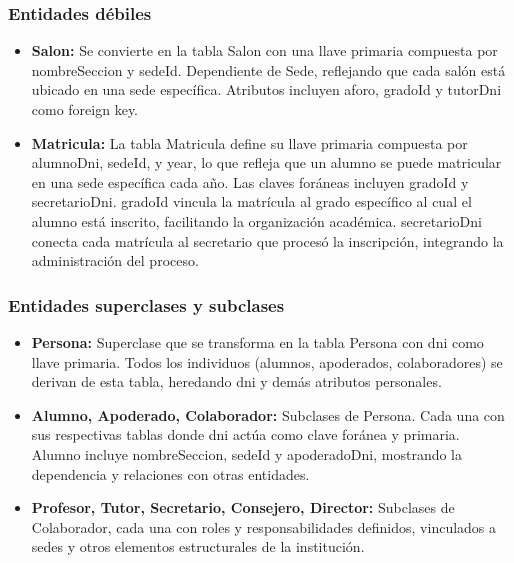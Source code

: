 \subsubsection{Entidades débiles}
\begin{itemize}
	\item \textbf{Salon:} Se convierte en la tabla Salon con una llave primaria compuesta por nombreSeccion y sedeId. Dependiente de Sede, reflejando que cada salón está ubicado en una sede específica. Atributos incluyen aforo, gradoId y tutorDni como foreign key.
	\item \textbf{Matricula:} La tabla Matricula define su llave primaria compuesta por alumnoDni, sedeId, y year, lo que refleja que un alumno se puede matricular en una sede específica cada año. Las claves foráneas incluyen gradoId y secretarioDni. gradoId vincula la matrícula al grado específico al cual el alumno está inscrito, facilitando la organización académica. secretarioDni conecta cada matrícula al secretario que procesó la inscripción, integrando la administración del proceso.
\end{itemize}
\subsubsection{Entidades superclases y subclases}
\begin{itemize}
	\item \textbf{Persona:} Superclase que se transforma en la tabla Persona con dni como llave primaria. Todos los individuos (alumnos, apoderados, colaboradores) se derivan de esta tabla, heredando dni y demás atributos personales.
	\item \textbf{Alumno, Apoderado, Colaborador:} Subclases de Persona. Cada una con sus respectivas tablas donde dni actúa como clave foránea y primaria. Alumno incluye nombreSeccion, sedeId y apoderadoDni, mostrando la dependencia y relaciones con otras entidades.
	\item \textbf{Profesor, Tutor, Secretario, Consejero, Director:} Subclases de Colaborador, cada una con roles y responsabilidades definidos, vinculados a sedes y otros elementos estructurales de la institución.
\end{itemize}
